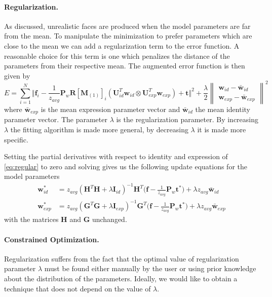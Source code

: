 \documentclass[11pt,a4paper,twoside]{report}
\begin{document}
\paragraph{Regularization.}
As discussed, unrealistic faces are produced when the model parameters are far
from the mean. To manipulate the minimization to prefer parameters which are
close to the mean we can add a regularization term to the error function. A reasonable choice for this term is
one which penalizes the distance of the parameters from their respective mean.
The augmented error function is then given by
\begin{equation}\label{eq:regular}
E = \sum_{i=1}^N \Big\Vert\mathbf{f}_i - \frac{1}{z_{avg}}\mathbf{P}_w\mathbf{R}[\mathbf{M}_{(1)}]_{i}(\mathbf{U}_{id}^T\mathbf{w}_{id} \otimes
\mathbf{U}_{exp}^T\mathbf{w}_{exp}) + \mathbf{t}\Big\Vert^2
+ \frac{\lambda}{2}\begin{Vmatrix}\mathbf{w}_{id} - \mathbf{\bar{w}}_{id}\\\mathbf{w}_{exp} - \mathbf{\bar{w}}_{exp}\end{Vmatrix}^2
\end{equation}
where $\mathbf{\bar{w}}_{exp}$ is the mean expression parameter vector and
$\mathbf{\bar{w}}_{id}$ the mean identity parameter vector. The parameter
$\lambda$ is the regularization parameter. By increasing $\lambda$ the fitting
algorithm is made more general, by decreasing $\lambda$ it is made more
specific. 

Setting the partial derivatives with respect to identity and expression of
\ref{eq:regular} to zero and solving gives us the following update equations for
the model parameters
\begin{align}
\mathbf{w}^*_{id} &=z_{avg}(\mathbf{H}^T\mathbf{H} + \lambda\mathbf{I}_{id})^{-1}\mathbf{H}^T\bigl(\mathbf{f}
- \frac{1}{z_{avg}}\mathbf{P}_w\mathbf{t}^*\bigr) + \lambda z_{avg}\mathbf{\bar{w}}_{id}\\
\mathbf{w}^*_{exp} &=z_{avg}(\mathbf{G}^T\mathbf{G} + \lambda\mathbf{I}_{exp})^{-1}\mathbf{G}^T\bigl(\mathbf{f} -
\frac{1}{z_{avg}}\mathbf{P}_w\mathbf{t}^*\bigr) + \lambda z_{avg}\mathbf{\bar{w}}_{exp}
\end{align}
with the matrices $\mathbf{H}$ and $\mathbf{G}$ unchanged.

\paragraph{Constrained Optimization.} Regularization suffers from the fact that
the optimal value of regularization parameter $\lambda$ must be found either
manually by the user or using prior knowledge about the distribution of the
parameters. Ideally, we would like to obtain a technique that does not depend on
the value of $\lambda$.
\end{document}
